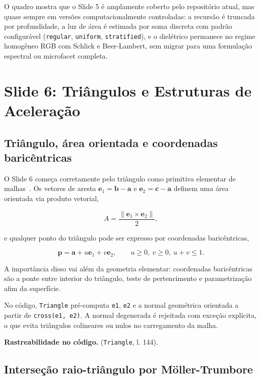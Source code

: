 \documentclass[portuguese]{sbcreviews-2025}%
\newcommand{\slidescite}[2]{\citep[pp.~#2]{#1}}
\begin{document}
O quadro mostra que o Slide 5 é amplamente coberto pelo repositório atual, mas quase sempre em versões computacionalmente controladas: a recursão é truncada por profundidade, a luz de área é estimada por soma discreta com padrão configurável (\texttt{regular}, \texttt{uniform}, \texttt{stratified}), e o dielétrico permanece no regime homogêneo RGB com Schlick e Beer-Lambert, sem migrar para uma formulação espectral ou microfacet completa.

\section{Slide 6: Triângulos e Estruturas de Aceleração}
\label{sec:slide6}

\subsection{Triângulo, área orientada e coordenadas baricêntricas}
\label{sec:slide6-triangulo}

O Slide 6 começa corretamente pelo triângulo como primitiva elementar de malhas~\slidescite{inf2608slides06}{3--4}. Os vetores de aresta $\mathbf{e}_1=\mathbf{b}-\mathbf{a}$ e $\mathbf{e}_2=\mathbf{c}-\mathbf{a}$ definem uma área orientada via produto vetorial,

\[
A = \frac{\lVert\mathbf{e}_1 \times \mathbf{e}_2\rVert}{2},
\]

e qualquer ponto do triângulo pode ser expresso por coordenadas baricêntricas,

\[
\mathbf{p}=\mathbf{a}+u\mathbf{e}_1+v\mathbf{e}_2,\qquad u\ge 0,\ v\ge 0,\ u+v\le 1.
\]

A importância disso vai além da geometria elementar: coordenadas baricêntricas são a ponte entre interior do triângulo, teste de pertencimento e parametrização afim da superfície.

No código, \texttt{Triangle} pré-computa \texttt{e1}, \texttt{e2} e a normal geométrica orientada a partir de \texttt{cross(e1, e2)}. A normal degenerada é rejeitada com exceção explícita, o que evita triângulos colineares ou nulos no carregamento da malha.

\noindent\textbf{Rastreabilidade no código.}  (\texttt{Triangle}, l. 144).

\subsection{Interseção raio-triângulo por Möller-Trumbore}
\label{sec:slide6-moller}
\end{document}
